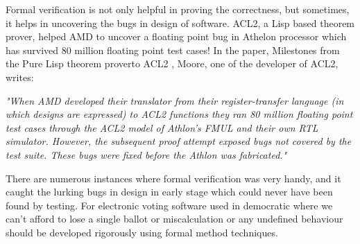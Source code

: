 	Formal verification is not only helpful in proving the correctness, 
	but sometimes, it helps in uncovering the bugs in design of
	software. ACL2, a Lisp based theorem prover, helped 
	AMD to uncover a floating point bug in Athelon processor which 
	has survived 80 million floating point test cases! 
	In the paper, Milestones from the Pure Lisp theorem proverto ACL2
	\cite{Moore2019}, Moore, one of the developer of ACL2, writes:
	
	\textit{"When AMD developed their translator 
	from their register-transfer language (in which designs
	are expressed) to ACL2 functions they ran 80 million 
	floating point test cases through the ACL2 model of 
	Athlon’s FMUL and their own RTL simulator. However, the 
	subsequent proof attempt exposed bugs not covered by the
	test suite. These bugs were fixed before the Athlon was 
	fabricated."}
	
	There are numerous instances where formal verification 
	was very handy, and it caught the lurking bugs in design in early 
	stage which could never have been found by testing. For 
	electronic voting software used in democratic where we 
	can't afford to lose a single ballot or miscalculation 
	or any undefined behaviour should be developed 
	rigorously using formal method techniques.  
	
	
%       
%       
		
